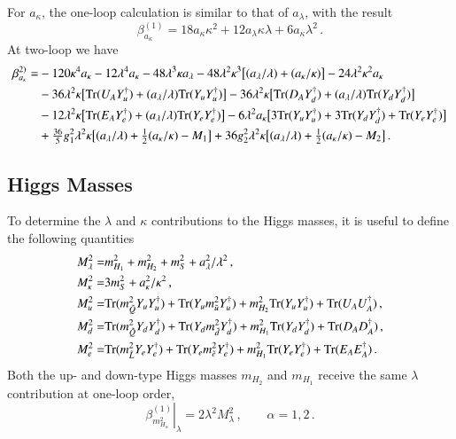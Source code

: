 \documentclass[final,3p,times]{elsarticle}
\newcommand{\lamsq}{\lambda^2}
\newcommand{\kapsq}{\kappa^2}
\newcommand{\tr}{\mathrm{Tr}}
\newcommand{\mhusq}{m^2_{H_2}}
\newcommand{\mhdsq}{m^2_{H_1}}
\newcommand{\mlamsq}{M_\lambda^2}
\newcommand{\mkapsq}{M_\kappa^2}
\newcommand{\mssq}{m_S^2}
\newcommand{\mqsq}{m_{\tilde{Q}}^2}
\newcommand{\mdsq}{m_{\tilde{d}}^2}
\newcommand{\musq}{m_{\tilde{u}}^2}
\newcommand{\mlsq}{m_{\tilde{L}}^2}
\newcommand{\mesq}{m_{\tilde{e}}^2}
\newcommand{\Alam}{a_\lambda/\lambda}
\newcommand{\Akap}{a_\kappa/\kappa}
\newcommand{\Musq}{M_u^2}
\newcommand{\Mdsq}{M_d^2}
\newcommand{\Mesq}{M_e^2}
\begin{document}
For $a_\kappa$, the one-loop calculation is similar to that of $a_\lambda$, with 
the result
%
\begin{equation}
\beta_{a_\kappa}^{(1)} = 18a_\kappa\kappa^2 + 12a_\lambda\kappa\lambda 
+ 6a_\kappa\lamsq\,.
\end{equation}
%
At two-loop we have
%
\begin{align}
\beta_{a_\kappa}^{2)} =& -120\kappa^4 a_\kappa - 12\lambda^4 a_\kappa 
- 48\lambda^3\kappa a_\lambda - 48\lamsq\kappa^3\big[ (\Alam) + (\Akap)\big]
-24\lamsq\kapsq a_\kappa \notag \\
%
&-36\lamsq\kappa\big[ \tr( U_A Y_u^\dagger) + (\Alam)\tr( Y_u Y_u^\dagger)\big]
-36\lamsq\kappa\big[ \tr( D_A Y_d^\dagger) + (\Alam)\tr( Y_d Y_d^\dagger)\big] 
\notag \\
%
&-12\lamsq\kappa\big[ \tr( E_A Y_e^\dagger) + (\Alam)\tr( Y_e Y_e^\dagger)\big]
-6\lamsq a_\kappa\big[ 3\tr( Y_u Y_u^\dagger) + 3\tr( Y_d Y_d^\dagger) 
+ \tr( Y_e Y_e^\dagger) \big] \notag \\
%
&+ \tfrac{36}{5}g_1^2\lamsq\kappa\big[ (\Alam) + \tfrac{1}{2}(\Akap) - M_1\big] 
+ 36g_2^2\lamsq \kappa\big[ (\Alam) + \tfrac{1}{2}(\Akap) - M_2 \big]\,.
\end{align}

\subsection{Higgs Masses}
To determine the $\lambda$ and $\kappa$ contributions to the Higgs masses, it is useful to define \cite{Ellwanger:2009dp} the following quantities 
%
\begin{align}
\mlamsq =& \mhdsq + \mhusq + \mssq + a_\lambda^2/\lamsq\,, \notag \\
%
\mkapsq =& 3\mssq + a_\kappa^2/\kapsq\,, \notag \\
%
\Musq =& \tr(\mqsq Y_u Y_u^\dagger) + \tr( Y_u\musq Y_u^\dagger)
+ \mhusq\tr( Y_u Y_u^\dagger) + \tr( U_A U_A^\dagger)\,, \notag \\
%
\Mdsq =& \tr(\mqsq Y_d Y_d^\dagger) + \tr( Y_d\mdsq Y_d^\dagger) 
+ \mhdsq\tr( Y_d Y_d^\dagger) + \tr( D_A D_A^\dagger)\,, \notag \\
%
\Mesq =& \tr(\mlsq Y_e Y_e^\dagger) + \tr( Y_e\mesq Y_e^\dagger) 
+ \mhdsq\tr( Y_e Y_e^\dagger) + \tr( E_A E_A^\dagger)\,. \notag \\
\end{align}
%
Both the up- and down-type Higgs masses $m_{H_2}$ and $m_{H_1}$ receive the same 
$\lambda$ contribution at one-loop order, 
%
\begin{equation}
\left.\beta_{m_{H_\alpha}^2}^{(1)}\right|_\lambda = 2\lamsq \mlamsq\,, \qquad \alpha = 1,2\,.
\end{equation}
%
\end{document}
